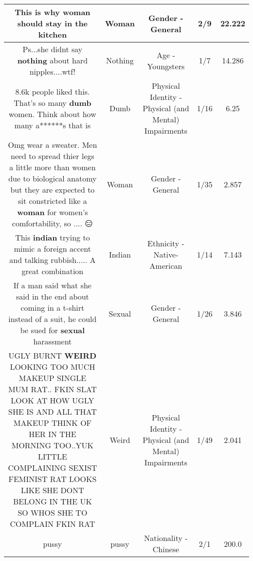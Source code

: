 \documentclass[11pt]{article}
\newlength\mylength
\begin{document}
\begin{center}
\begin{longtable}{|C{.65\mylength}|C{.30\mylength}|C{.12\mylength}|C{.12\mylength}|C{.12\mylength}|}
  \small This is why \textbf{woman} should stay in the kitchen\normalsize   & Woman & Gender - General & 2/9 & 22.222 \\  \hline
  \small Ps...she didnt say \textbf{nothing} about hard nipples....wtf!\normalsize   & Nothing & Age - Youngsters & 1/7 & 14.286 \\  \hline
  \small 8.6k people liked this. That's so many \textbf{dumb} women. Think about how many a******s that is\normalsize   & Dumb & Physical Identity - Physical (and Mental) Impairments & 1/16 & 6.25 \\  \hline
  \small Omg wear a sweater. Men need to spread thier legs a little more than women due to biological anatomy but they are expected to sit constricted like a \textbf{woman} for  women's comfortability, so .... 😑\normalsize   & Woman & Gender - General & 1/35 & 2.857 \\  \hline
  \small This \textbf{indian} trying to mimic a foreign accent and talking rubbish..... A great combination\normalsize   & Indian & Ethnicity - Native-American & 1/14 & 7.143 \\  \hline
  \small If a man said what she said in the end about coming in a t-shirt instead of a suit, he could be sued for \textbf{sexual} harassment\normalsize   & Sexual & Gender - General & 1/26 & 3.846 \\  \hline
  \small UGLY BURNT \textbf{WEIRD} LOOKING TOO MUCH MAKEUP SINGLE MUM RAT.. FKIN SLAT LOOK AT HOW UGLY SHE IS AND ALL THAT MAKEUP THINK OF HER IN THE MORNING TOO..YUK LITTLE COMPLAINING SEXIST FEMINIST RAT LOOKS LIKE SHE DONT BELONG IN THE UK SO WHOS SHE TO COMPLAIN FKIN RAT\normalsize   & Weird & Physical Identity - Physical (and Mental) Impairments & 1/49 & 2.041 \\  \hline
  \small pussy\normalsize   & pussy & Nationality - Chinese & 2/1 & 200.0 \\  \hline

\end{longtable}
\end{center}
\end{document}
